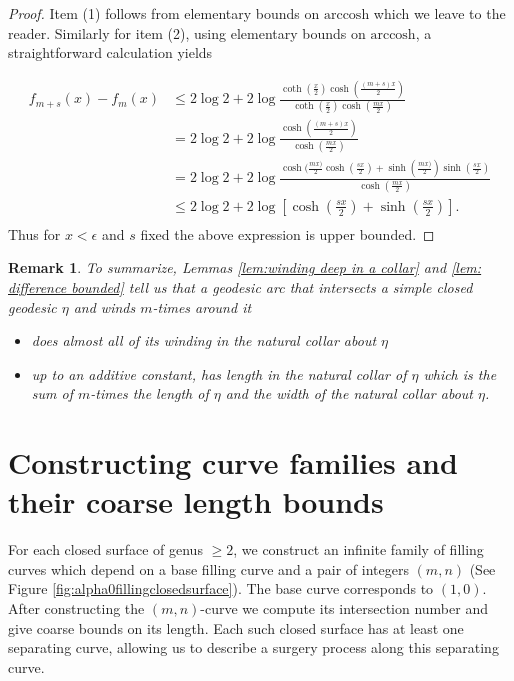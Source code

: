 \documentclass[12pt]{amsart}
\numberwithin{equation}{section}
\theoremstyle{plain}
\newtheorem{rem}[thm]{Remark}
\begin{document}
\begin{proof} Item (1) follows from elementary bounds
on $\text{arccosh}$ which we leave to the reader. 
Similarly for item (2), using elementary bounds on $\text{arccosh}$,  a straightforward calculation yields

  \begin{align*}
 f_{m+s}(x)- f_{m}(x) &\leq
 2\log 2 +
 2\log {\frac{\coth \left(\frac{x}{2}\right)  \cosh \left(\frac{(m+s)x}{2} \right)}{\coth \left(\frac{x}{2}\right)  \cosh \left(\frac{mx}{2} \right)}}  \\
  &=2\log 2 +
 2\log {\frac{\cosh \left(\frac{(m+s)x}{2} \right)}{\cosh \left(\frac{mx}{2} \right)}} \\
 &=2\log 2 +
 2\log {\frac{\cosh (\frac{mx)}{2} 
 \cosh (\frac{sx}{2})+\sinh (\frac{mx)}{2} )
 \sinh (\frac{sx}{2})}{\cosh \left(\frac{mx}{2} \right)}} \\
 &\leq 2 \log 2 + 2\log \left[
 \cosh (\frac{sx}{2})+
 \sinh (\frac{sx}{2})\right].\\
\end{align*}
Thus for $x<\epsilon$ and $s$ fixed the above expression is upper bounded. 
\end{proof}

\begin{rem}
To summarize, Lemmas \ref{lem:winding deep in a collar} and  \ref{lem: difference bounded} tell us that a geodesic arc that intersects a simple closed geodesic 
$\eta$ and winds $m$-times around it 
\begin{itemize}
\item does almost all of its winding in the natural collar about $\eta$
\item  up to an additive constant, has  length  in the natural collar of $\eta$  which is the sum of $m$-times the length of $\eta$ and the width of the natural collar about $\eta$.
\end{itemize}
\end{rem}







 \section{Constructing curve  families and their coarse length bounds} \label{sec: curve family}
  

For each closed surface of genus $\geq 2$, we   construct an infinite  family of filling curves   which depend on a base filling curve and a pair of integers $(m,n)$ (See Figure \ref{fig:alpha0fillingclosedsurface}).  The base curve corresponds to $(1,0)$. After constructing the $(m,n)$-curve we compute its intersection number and give coarse bounds on its length. Each such closed surface has at least one  separating curve, allowing us to describe a surgery process along this separating curve. 
\end{document}
